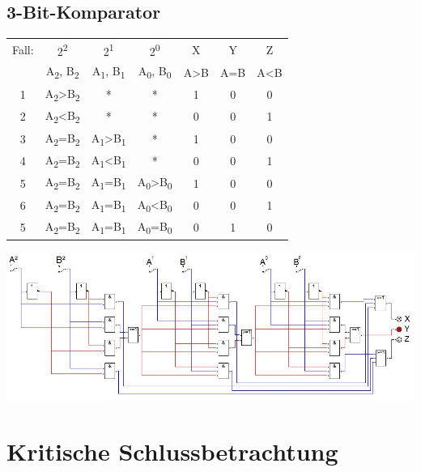 \documentclass[a4paper, 11pt, fleqn, DIV=10, twoside, BCOR=10mm]{scrreprt}
\begin{document}
\begin{center}
\section{3-Bit-Komparator}
\vspace{10mm}
\begin{tabular}{c|c|c|c|c|c|c}
Fall:&2\textsuperscript{2}&2\textsuperscript{1}&2\textsuperscript{0}&X&Y&Z\\
 &A\textsubscript{2}, B\textsubscript{2}&A\textsubscript{1}, B\textsubscript{1}&A\textsubscript{0}, B\textsubscript{0}&A>B&A=B&A<B\\
\hline
1&A\textsubscript{2}>B\textsubscript{2}&*&*&1&0&0\\
2&A\textsubscript{2}<B\textsubscript{2}&*&*&0&0&1\\
\hline
3&A\textsubscript{2}=B\textsubscript{2}&A\textsubscript{1}>B\textsubscript{1}&*&1&0&0\\
4&A\textsubscript{2}=B\textsubscript{2}&A\textsubscript{1}<B\textsubscript{1}&*&0&0&1\\
\hline
5&A\textsubscript{2}=B\textsubscript{2}&A\textsubscript{1}=B\textsubscript{1}&A\textsubscript{0}>B\textsubscript{0}&1&0&0\\
6&A\textsubscript{2}=B\textsubscript{2}&A\textsubscript{1}=B\textsubscript{1}&A\textsubscript{0}<B\textsubscript{0}&0&0&1\\
5&A\textsubscript{2}=B\textsubscript{2}&A\textsubscript{1}=B\textsubscript{1}&A\textsubscript{0}=B\textsubscript{0}&0&1&0\\
\end{tabular}
\vspace{20mm}

%
\includegraphics[width=1.25\columnwidth]{DT5Graphics/3_Bit_Komperator.jpg}
%
\end{center}
\newpage
\chapter{Kritische Schlussbetrachtung}
\end{document}
